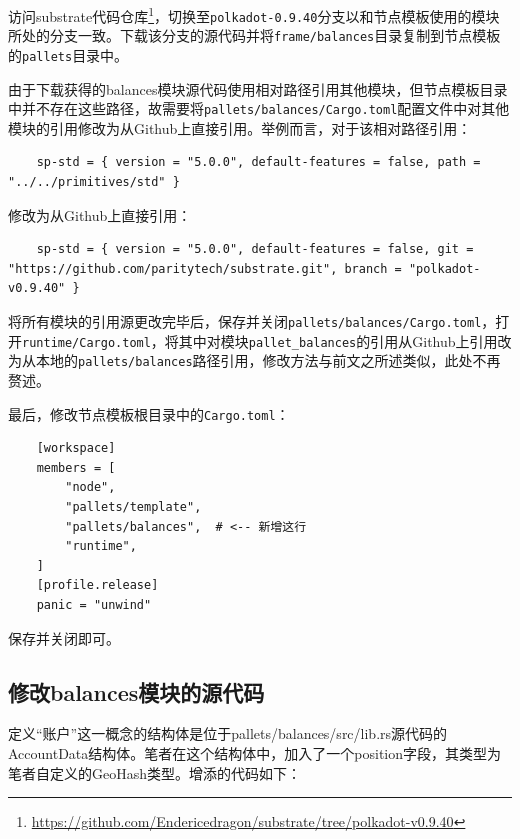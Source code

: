 访问substrate代码仓库\footnote{\url{https://github.com/Endericedragon/substrate/tree/polkadot-v0.9.40}}，切换至\verb|polkadot-0.9.40|分支以和节点模板使用的模块所处的分支一致。下载该分支的源代码并将\verb|frame/balances|目录复制到节点模板的\verb|pallets|目录中。

由于下载获得的balances模块源代码使用相对路径引用其他模块，但节点模板目录中并不存在这些路径，故需要将\verb|pallets/balances/Cargo.toml|配置文件中对其他模块的引用修改为从Github上直接引用。举例而言，对于该相对路径引用：

\begin{lstlisting}
    sp-std = { version = "5.0.0", default-features = false, path = "../../primitives/std" }
\end{lstlisting}

修改为从Github上直接引用：

\begin{lstlisting}
    sp-std = { version = "5.0.0", default-features = false, git = "https://github.com/paritytech/substrate.git", branch = "polkadot-v0.9.40" }
\end{lstlisting}

将所有模块的引用源更改完毕后，保存并关闭\verb|pallets/balances/Cargo.toml|，打开\verb|runtime/Cargo.toml|，将其中对模块\verb|pallet_balances|的引用从Github上引用改为从本地的\verb|pallets/balances|路径引用，修改方法与前文之所述类似，此处不再赘述。

最后，修改节点模板根目录中的\verb|Cargo.toml|：

\begin{lstlisting}
    [workspace]
    members = [
        "node",
        "pallets/template",
        "pallets/balances",  # <-- 新增这行
        "runtime",
    ]
    [profile.release]
    panic = "unwind"
\end{lstlisting}

保存并关闭即可。

\subsection{修改balances模块的源代码}

定义“账户”这一概念的结构体是位于pallets/balances/src/lib.rs源代码的AccountData结构体。笔者在这个结构体中，加入了一个position字段，其类型为笔者自定义的GeoHash类型。增添的代码如下：

